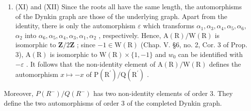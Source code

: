 \begin{enumerate}
\def\labelenumi{(\Roman{enumi})}
\setcounter{enumi}{10}
\tightlist
\item
  (XI) and (XII) Since the roots all have the same length, the automorphisms of the Dynkin graph are those of the underlying graph. Apart from the identity, there is only the automorphism \(\varepsilon\) which transforms \(\alpha_{1},\alpha_{3},\alpha_{4},\alpha_{5},\alpha_{6},\) \(\alpha_{2}\) into \(\alpha_{6},\alpha_{5},\alpha_{4},\alpha_{3},\alpha_{1},\alpha_{2}\) , respectively. Hence, \(\mathrm{A(R) / W(R)}\) is isomorphic to \(\mathbf{Z} / 2\mathbf{Z}\) ; since \(-1\in \mathrm{W(R)}\) (Chap. V. §6, no. 2, Cor. 3 of Prop. 3), \(\mathrm{A(R)}\) is isomorphic to \(\mathrm{W(R)}\times \{1, - 1\}\) and \(w_0\) can be identified with \(-\varepsilon\) . It follows that the non-identity element of \(\mathrm{A(R) / W(R)}\) defines the automorphism \(x\mapsto -x\) of \(\mathrm{P(R^{\prime}) / Q(R^{\prime})}\) .
\end{enumerate}

Moreover, \(P(R^{-})/Q(R^{-})\) has two non-identity elements of order 3. They define the two automorphisms of order 3 of the completed Dynkin graph.

